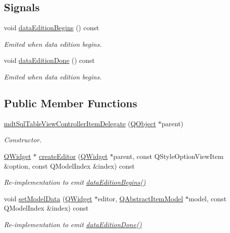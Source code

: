 \subsection*{Signals}
\begin{DoxyCompactItemize}
\item 
void \hyperlink{classmdt_sql_table_view_controller_item_delegate_a63f3c0cd443db6b60d4d088548e1566a}{data\-Edition\-Begins} () const 
\begin{DoxyCompactList}\small\item\em Emited when data edition begins. \end{DoxyCompactList}\item 
void \hyperlink{classmdt_sql_table_view_controller_item_delegate_a3967fd8b9766b30703e135af36f3bbbd}{data\-Edition\-Done} () const 
\begin{DoxyCompactList}\small\item\em Emited when data edition begins. \end{DoxyCompactList}\end{DoxyCompactItemize}
\subsection*{Public Member Functions}
\begin{DoxyCompactItemize}
\item 
\hyperlink{classmdt_sql_table_view_controller_item_delegate_a304a2fa2b1635342b73f7e5c9de2bf49}{mdt\-Sql\-Table\-View\-Controller\-Item\-Delegate} (\hyperlink{class_q_object}{Q\-Object} $\ast$parent)
\begin{DoxyCompactList}\small\item\em Constructor. \end{DoxyCompactList}\item 
\hyperlink{class_q_widget}{Q\-Widget} $\ast$ \hyperlink{classmdt_sql_table_view_controller_item_delegate_a3a5bf3cc099da099f493fd2fb0298b4a}{create\-Editor} (\hyperlink{class_q_widget}{Q\-Widget} $\ast$parent, const Q\-Style\-Option\-View\-Item \&option, const Q\-Model\-Index \&index) const 
\begin{DoxyCompactList}\small\item\em Re-\/implementation to emit \hyperlink{classmdt_sql_table_view_controller_item_delegate_a63f3c0cd443db6b60d4d088548e1566a}{data\-Edition\-Begins()} \end{DoxyCompactList}\item 
void \hyperlink{classmdt_sql_table_view_controller_item_delegate_a07e3d9f0b2b41560a7e0b5e998f448ff}{set\-Model\-Data} (\hyperlink{class_q_widget}{Q\-Widget} $\ast$editor, \hyperlink{class_q_abstract_item_model}{Q\-Abstract\-Item\-Model} $\ast$model, const Q\-Model\-Index \&index) const 
\begin{DoxyCompactList}\small\item\em Re-\/implementation to emit \hyperlink{classmdt_sql_table_view_controller_item_delegate_a3967fd8b9766b30703e135af36f3bbbd}{data\-Edition\-Done()} \end{DoxyCompactList}\end{DoxyCompactItemize}


